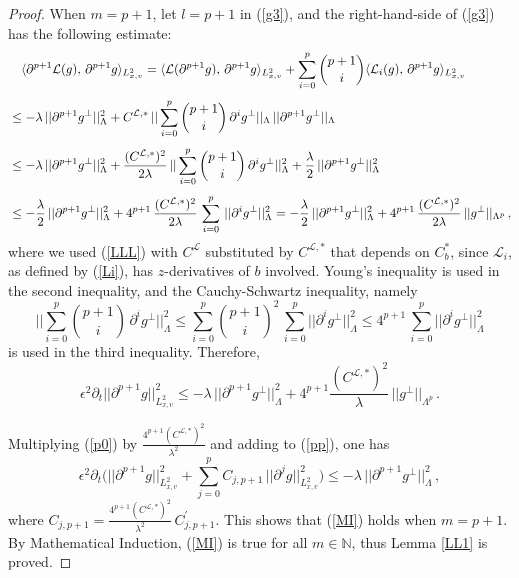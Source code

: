 \documentclass[final,onefignum,onetabnum]{siamart171218}
\begin{document}
\begin{proof}
When $m=p+1$, let $l=p+1$ in (\ref{g3}), and the right-hand-side of (\ref{g3}) has the following estimate: 
\begin{align}
&\displaystyle \quad\langle \partial^{p+1}\mathcal L(g), \, \partial^{p+1}g\rangle_{L^2_{x,v}} = \langle\mathcal L(\partial^{p+1} g), \, \partial^{p+1} g\rangle_{L^2_{x,v}}
+ \sum_{i=0}^{p}\binom{p+1}{i} \langle\mathcal L_{i}(g), \, \partial^{p+1} g\rangle_{L^2_{x,v}}\notag\\[4pt]
&\displaystyle  \leq -\lambda\, ||\partial^{p+1} g^{\perp}||_{\Lambda}^2 + C^{\mathcal L, \ast}\, 
||\sum_{i=0}^{p} \binom{p+1}{i}\, \partial^{i}g^{\perp}||_{\Lambda}\, ||\partial^{p+1} g^{\perp}||_{\Lambda}\notag\\[4pt]
&\displaystyle \leq  -\lambda\, ||\partial^{p+1} g^{\perp}||_{\Lambda}^2 + \frac{(C^{\mathcal L, \ast})^2}{2\lambda}\, 
||\sum_{i=0}^{p} \binom{p+1}{i}\, \partial^{i}g^{\perp}||_{\Lambda}^2+\frac{\lambda}{2}\, ||\partial^{p+1} g^{\perp}||_{\Lambda}^2 \notag\\[4pt]
&\label{p+1}\displaystyle \leq -\frac{\lambda}{2}\, ||\partial^{p+1} g^{\perp}||_{\Lambda}^2 + 
4^{p+1}\,\frac{(C^{\mathcal L, \ast})^2}{2\lambda}\, \sum_{i=0}^{p}\, ||\partial^{i}g^{\perp}||_{\Lambda}^2 
= -\frac{\lambda}{2}\, ||\partial^{p+1} g^{\perp}||_{\Lambda}^2+
4^{p+1}\,\frac{(C^{\mathcal L, \ast})^2}{2\lambda}\, ||g^{\perp}||_{\Lambda^{p}}\,,
\end{align}
where we used (\ref{LLL}) with $C^{\mathcal L}$ substituted by $C^{\mathcal L, \ast}$ that depends on $C_b^{\ast}$, since $\mathcal L_{i}$, as defined by 
(\ref{Li}), has $z$-derivatives of $b$ involved. Young's inequality is used in the second inequality, and 
the Cauchy-Schwartz inequality, namely 
$$||\sum_{i=0}^{p}\binom{p+1}{i}\, \partial^{i}g^{\perp}||_{\Lambda}^2 \leq \sum_{i=0}^{p}\binom{p+1}{i}^2\, \sum_{i=0}^{p} ||\partial^{i}g^{\perp}||_{\Lambda}^2 
\leq 4^{p+1}\, \sum_{i=0}^{p} ||\partial^{i}g^{\perp}||_{\Lambda}^2 $$
is used in the third inequality.
Therefore, 
\begin{equation}\label{pp}\epsilon^2 \partial_t ||\partial^{p+1}g||_{L^2_{x,v}}^2 \leq -\lambda\, ||\partial^{p+1}g^{\perp}||_{\Lambda}^2 + 4^{p+1}\frac{(C^{\mathcal L, \ast})^2}{\lambda}\, ||g^{\perp}||_{\Lambda^{p}}\,.\end{equation}

Multiplying (\ref{p0}) by 
$\displaystyle\frac{4^{p+1}(C^{\mathcal L, \ast})^2}{\lambda^2}$ and adding to (\ref{pp}), one has
$$\epsilon^2\partial_t \bigg( ||\partial^{p+1}g||_{L^2_{x,v}}^2 + \sum_{j=0}^{p}C_{j,p+1}\, ||\partial^j g||_{L^2_{x,v}}^2\bigg) 
\leq -\lambda\, ||\partial^{p+1}g^{\perp}||_{\Lambda}^2\,,$$
where 
$\displaystyle C_{j,p+1}=\frac{4^{p+1}(C^{\mathcal L, \ast})^2}{\lambda^2}\, C_{j,p+1}^{\prime}$. 
This shows that (\ref{MI}) holds when $m=p+1$. By Mathematical Induction, (\ref{MI}) is true for all $m\in \mathbb N$, thus 
Lemma \ref{LL1} is proved. 
\end{proof}
\end{document}
